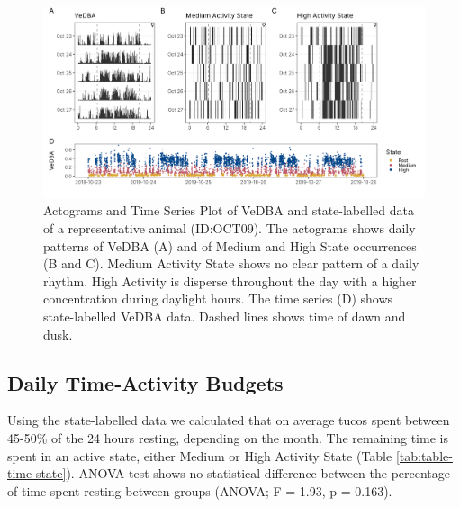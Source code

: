 \documentclass[english,msc,numbers,hidelinks]{coppe}
\begin{document}
  \begin{figure}

  {\centering \includegraphics[width=1\linewidth]{../04_figures/actograms/actograms_results} 

  }

  \caption{Actograms and Time Series Plot of VeDBA and state-labelled data of a representative animal (ID:OCT09). The actograms shows daily patterns of VeDBA (A) and of Medium and High State occurrences (B and C). Medium Activity State shows no clear pattern of a daily rhythm. High Activity is disperse throughout the day with a higher concentration during daylight hours. The time series (D) shows state-labelled VeDBA data. Dashed lines shows time of dawn and dusk.}\label{fig:actograms-results}
  \end{figure}
  \clearpage

  \hypertarget{daily-time-activity-budgets}{%
  \subsection{Daily Time-Activity Budgets}\label{daily-time-activity-budgets}}

  Using the state-labelled data we calculated that on average tucos spent between 45-50\% of the 24 hours resting, depending on the month. The remaining time is spent in an active state, either Medium or High Activity State (Table \ref{tab:table-time-state}). ANOVA test shows no statistical difference between the percentage of time spent resting between groups (ANOVA; F = 1.93, p = 0.163).
\end{document}
